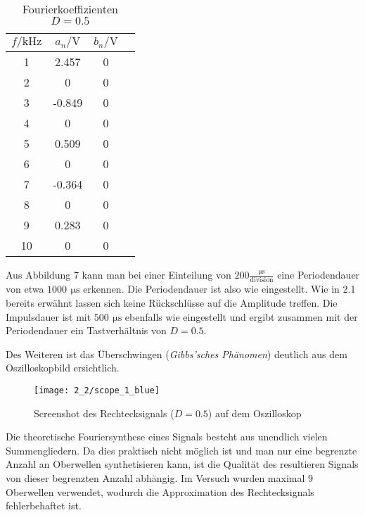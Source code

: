 \documentclass[a4paper, 12pt]{article}
\begin{document}
\begin{table}[H]
\begin{center}
\begin{tabular}{@{}cccc@{}}
\toprule
$f/\si{\kilo\hertz}$ & $a_n / \si{\volt}$ & $b_n / \si{\volt}$ \\ \midrule
1                      &  2.457     & 0     \\
2                      &  0     & 0     \\
3                      &  -0.849     & 0     \\
4                      &  0     & 0     \\
5                      &  0.509     & 0     \\
6                      &  0     & 0     \\
7                      &  -0.364     & 0     \\
8                      &  0    & 0     \\
9                      &  0.283     & 0     \\
10                     &  0    & 0     \\ \bottomrule
\end{tabular}
\end{center}
\caption{Fourierkoeffizienten $D = 0.5$}
\end{table}

\noindent Aus Abbildung 7 kann man bei einer Einteilung von $200 \frac{\si{\micro\second}}{\textrm{division}}$ eine Periodendauer von etwa $1000 \,\ \si{\micro\second}$ erkennen. Die Periodendauer ist also wie eingestellt. Wie in 2.1 bereits erwähnt lassen sich keine Rückschlüsse auf die Amplitude treffen. Die Impulsdauer ist mit $ 500 \,\ \si{\micro\second}$ ebenfalls wie eingestellt und ergibt zusammen mit der Periodendauer ein Tastverhältnis von $D = 0.5$.

\noindent Des Weiteren ist das Überschwingen (\textit{Gibbs'sches Phänomen}) deutlich aus dem Oszilloskopbild ersichtlich.


\begin{figure}[H]
  \texttt{[image: 2\_2/scope\_1\_blue]}
  \caption{Screenshot des Rechtecksignals ($D = 0.5$) auf dem Oszilloskop}
\end{figure}


\noindent Die theoretische Fouriersynthese eines Signals besteht aus unendlich vielen Summengliedern. Da dies praktisch nicht möglich ist und man nur eine begrenzte Anzahl an Oberwellen synthetisieren kann, ist die Qualität des resultieren Signals von dieser begrenzten Anzahl abhängig. Im Versuch wurden maximal 9 Oberwellen verwendet, wodurch die Approximation des Rechtecksignals fehlerbehaftet ist. 
\end{document}
